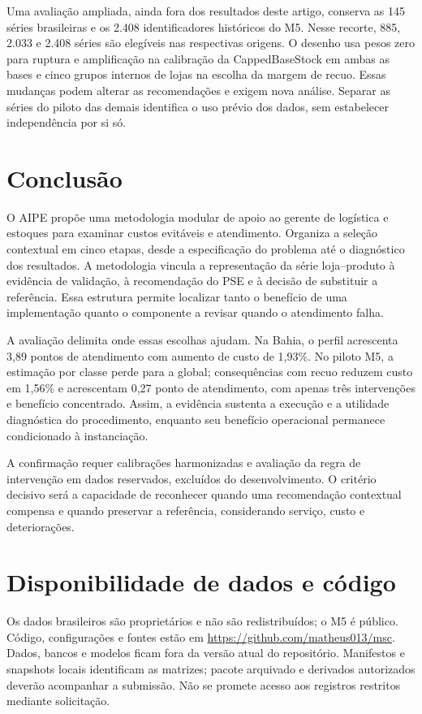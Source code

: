 \documentclass[preprint,12pt]{elsarticle}
\begin{document}
Uma avaliação ampliada, ainda fora dos resultados deste artigo, conserva as 145 séries brasileiras e os 2.408 identificadores históricos do M5. Nesse recorte, 885, 2.033 e 2.408 séries são elegíveis nas respectivas origens. O desenho usa pesos zero para ruptura e amplificação na calibração da CappedBaseStock em ambas as bases e cinco grupos internos de lojas na escolha da margem de recuo. Essas mudanças podem alterar as recomendações e exigem nova análise. Separar as séries do piloto das demais identifica o uso prévio dos dados, sem estabelecer independência por si só.

\section{Conclusão}
O AIPE propõe uma metodologia modular de apoio ao gerente de logística e estoques para examinar custos evitáveis e atendimento. Organiza a seleção contextual em cinco etapas, desde a especificação do problema até o diagnóstico dos resultados. A metodologia vincula a representação da série loja--produto à evidência de validação, à recomendação do PSE e à decisão de substituir a referência. Essa estrutura permite localizar tanto o benefício de uma implementação quanto o componente a revisar quando o atendimento falha.

A avaliação delimita onde essas escolhas ajudam. Na Bahia, o perfil acrescenta 3,89 pontos de atendimento com aumento de custo de 1,93\%. No piloto M5, a estimação por classe perde para a global; consequências com recuo reduzem custo em 1,56\% e acrescentam 0,27 ponto de atendimento, com apenas três intervenções e benefício concentrado. Assim, a evidência sustenta a execução e a utilidade diagnóstica do procedimento, enquanto seu benefício operacional permanece condicionado à instanciação.

A confirmação requer calibrações harmonizadas e avaliação da regra de intervenção em dados reservados, excluídos do desenvolvimento. O critério decisivo será a capacidade de reconhecer quando uma recomendação contextual compensa e quando preservar a referência, considerando serviço, custo e deteriorações.

\section*{Disponibilidade de dados e código}
Os dados brasileiros são proprietários e não são redistribuídos; o M5 é público. Código, configurações e fontes estão em \url{https://github.com/matheus013/msc}. Dados, bancos e modelos ficam fora da versão atual do repositório. Manifestos e snapshots locais identificam as matrizes; pacote arquivado e derivados autorizados deverão acompanhar a submissão. Não se promete acesso aos registros restritos mediante solicitação.
\end{document}

